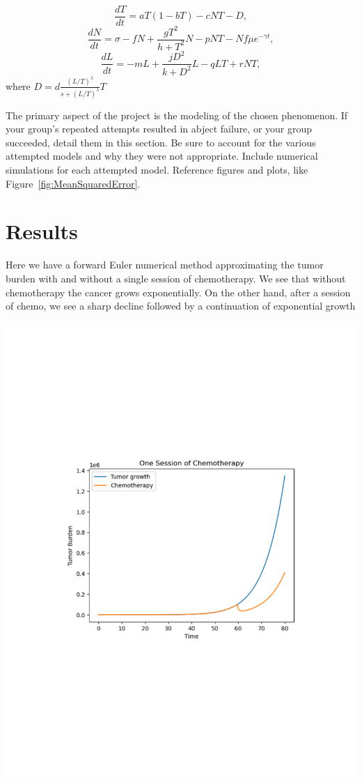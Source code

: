 \documentclass[11pt]{amsart}
\begin{document}
\begin{equation} \label{eq1}
\frac{dT}{dt} = aT(1-bT) - cNT - D \label{eq: dT},
\end{equation}
\begin{equation} \label{eq2}
\frac{dN}{dt} = \sigma - fN +\frac{gT^2}{h + T^2}N - pNT - Nf \mu e^{-\gamma t} \label{eq: dN},
\end{equation}
\begin{equation} \label{eq3}
\frac{dL}{dt} = - mL +\frac{jD^2}{k + D^2}L - qLT + rNT \label{eq: dL},
\end{equation}
where $D = d\frac{(L/T)^\lambda}{s + (L/T)^\lambda}T$


 The primary aspect of the project is the modeling of the chosen phenomenon. If your group's repeated attempts resulted in abject failure, or your group succeeded, detail them in this section. Be sure to account for the various attempted models and why they were not appropriate. Include numerical simulations for each attempted model.  Reference figures and plots, like Figure~\ref{fig:MeanSquaredError}.


\section{Results}

Here we have a forward Euler numerical method approximating the tumor burden with and without a single session of chemotherapy. 
We see that without chemotherapy the cancer grows exponentially. 
On the other hand, after a session of chemo, 
we see a sharp decline followed by a continuation of exponential growth

\includegraphics[width=\textwidth]{./images/chemo.pdf}
\end{document}
